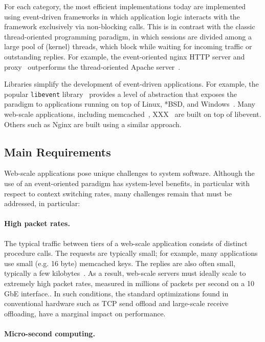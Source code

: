 For each category, the most efficient implementations today are
implemented using event-driven frameworks in which application logic
interacts with the framework exclusively via non-blocking calls.  This
is in contrast with the classic thread-oriented programming paradigm,
in which sessions are divided among a large pool of (kernel)
threads, which block while waiting for incoming traffic or outstanding
replies.  For example, the event-oriented nginx HTTP
server and proxy~\cite{reese2008nginx} outperforms the thread-oriented Apache server~\cite{misc:apache}.

Libraries simplify the development of event-driven applications.  For
example, the popular \texttt{libevent} library~\cite{provos2003libevent} provides a level of
abstraction that exposes the paradigm to applications running on top
of Linux, *BSD, and Windows~\cite{missing}.  Many web-scale
applications, including memcached~\cite{missing}, XXX~\cite{missing} are built on top
of libevent.  Others such as Nginx are built using a similar approach.


\subsection{Main Requirements}
\label{sec:motivation:challenges}

Web-scale applications pose unique challenges to system software.
Although the use of an event-oriented paradigm has system-level
benefits, in particular with respect to context switching rates, many
challenges remain that must be addressed, in particular:

\paragraph{High packet rates.}

The typical traffic between tiers of a web-scale application consists
of distinct procedure calls.  The requests are typically small; for
example, many applications use small (e.g. 16 byte) memcached keys.
The replies are also often small, typically a few
kilobytes~\cite{missing}.  As a result, web-scale servers must ideally
scale to extremely high packet rates, measured in millions of packets
per second on a 10 GbE interface..  In such conditions, the standard
optimizations found in conventional hardware such as TCP send offload
and large-scale receive offloading, have a marginal impact on
performance.

\paragraph{Micro-second computing.}


